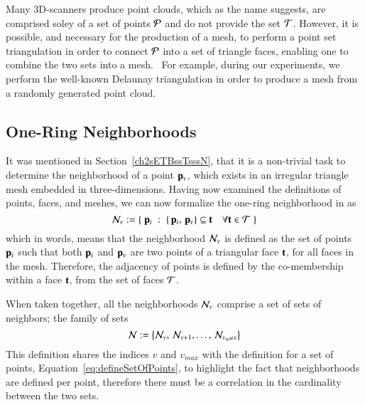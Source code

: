 Many 3D-scanners produce point clouds, which as the name suggests, are comprised soley of a set of points $\mathcal{P}$ and do not provide the set $\mathcal{T}$. However, it is possible, and necessary for the production of a mesh, to perform a point set triangulation in order to connect $\mathcal{P}$ into a set of triangle faces, enabling one to combine the two sets into a mesh.~\cite[p.~26]{Mara12} For example, during our experiments, we perform the well-known Delaunay triangulation in order to produce a mesh from a randomly generated point cloud.

%
%
%
%
\subsection{One-Ring Neighborhoods}
\label{ch2sTDDssORN}
It was mentioned in Section~\ref{ch2sETBssTsssN}, that it is a non-trivial task to determine the neighborhood of a point $\mathbf{p}_v$, which exists in an irregular triangle mesh embedded in three-dimensions. Having now examined the definitions of points, faces, and meshes, we can now formalize the one-ring neighborhood in \tdd{} as
%
\begin{equation}
	\mathcal{N}_v := \left \{\;\mathbf{p}_i\;:\;\left \{\,\mathbf{p}_i,\,\mathbf{p}_v\right \} \subseteq \mathbf{t} \quad \forall \mathbf{t} \in \mathcal{T}\;\right \}
	\label{eq:defineNeighborhood}
\end{equation}%
%
%
%
which in words, means that the neighborhood $\mathcal{N}_v$ is defined as the set of points $\mathbf{p}_i$ such that both $\mathbf{p}_i$ and $\mathbf{p}_v$ are two points of a triangular face $\mathbf{t}$, for all faces in the mesh. Therefore, the adjacency of points is defined by the co-membership within a face $\mathbf{t}$, from the set of faces $\mathcal{T}$.

When taken together, all the neighborhoods $\mathcal{N}_v$ comprise a set of sets of neighbors; the family of sets
%
\begin{equation}
	\mathcal{N} := \left \{\mathcal{N}_v,\,\mathcal{N}_{v+1},\ldots,\,\mathcal{N}_{v_max}\right \}
	\label{eq:defineNeighborhood}
\end{equation}%
%
This definition shares the indices $v$ and $v_{max}$ with the definition for a set of points, Equation~\ref{eq:defineSetOfPoints}, to highlight the fact that neighborhoods are defined per point, therefore there must be a correlation in the cardinality between the two sets.

